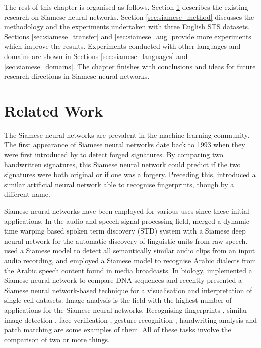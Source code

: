 The rest of this chapter is organised as follows. Section \ref{sec:siamese_related} describes the existing research on Siamese neural networks. Section \ref{sec:siamese_method} discusses the methodology and the experiments undertaken with three English STS datasets. Sections \ref{sec:siamese_transfer} and \ref{sec:siamese_aug} provide more experiments which improve the results. Experiments conducted with other languages and domains are shown in Sections \ref{sec:siamese_languages} and \ref{sec:siamese_domains}. The chapter finishes with conclusions and ideas for future research directions in Siamese neural networks. 

\section{Related Work}
\label{sec:siamese_related}

The Siamese neural networks are prevalent in the machine learning community. The first appearance of Siamese neural networks date back to 1993 when they were first introduced by \textcite{doi:10.1142/S0218001493000339} to detect forged signatures. By comparing two handwritten signatures, this Siamese neural network could predict if the two signatures were both original or if one was a forgery. Preceding this, \textcite{6797067} introduced a similar artificial neural network able to recognise fingerprints, though by a different name. 

Siamese neural networks have been employed for various uses since these initial applications. In the audio and speech signal processing field, \textcite{thiolliere2015hybrid} merged a dynamic-time warping based spoken term discovery (STD) system with a Siamese deep neural network for the automatic discovery of linguistic units from raw speech. \textcite{8461524} used a Siamese model to detect all semantically similar audio clips from an input audio recording, and \textcite{8268960} employed a Siamese model to recognise Arabic dialects from the Arabic speech content found in media broadcasts. In biology, \textcite{10.1093/bioinformatics/bty887} implemented a Siamese neural network to compare DNA sequences and recently \textcite{Szubert2019} presented a Siamese neural network-based technique for a visualisation and interpretation of single-cell datasets. Image analysis is the field with the highest number of applications for the Siamese neural networks. Recognising fingerprints \autocite{6797067}, similar image detection \autocite{1467314,rs10020355,21be1428c6a44fb7a32d49ba83126bcb,6976727,6636646}, face verification \autocite{Taigman_2014_CVPR}, gesture recognition \autocite{7163112}, handwriting analysis \autocite{8269987} and patch matching \autocite{HANIF201954} are some examples of them. All of these tasks involve the comparison of two or more things.

